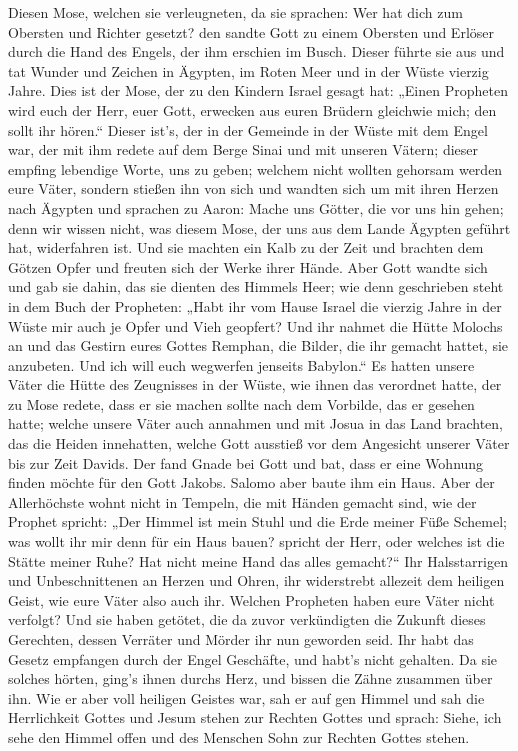  Diesen Mose, welchen sie verleugneten, da sie sprachen:
Wer hat dich zum Obersten und Richter gesetzt? den sandte Gott zu einem
Obersten und Erlöser durch die Hand des Engels, der ihm erschien im
Busch.  Dieser führte sie aus und tat Wunder und Zeichen
in Ägypten, im Roten Meer und in der Wüste vierzig Jahre.
 Dies ist der Mose, der zu den Kindern Israel gesagt hat:
„Einen Propheten wird euch der Herr, euer Gott, erwecken aus euren
Brüdern gleichwie mich; den sollt ihr hören.``  Dieser
ist's, der in der Gemeinde in der Wüste mit dem Engel war, der mit ihm
redete auf dem Berge Sinai und mit unseren Vätern; dieser empfing
lebendige Worte, uns zu geben;  welchem nicht wollten
gehorsam werden eure Väter, sondern stießen ihn von sich und wandten
sich um mit ihren Herzen nach Ägypten  und sprachen zu
Aaron: Mache uns Götter, die vor uns hin gehen; denn wir wissen nicht,
was diesem Mose, der uns aus dem Lande Ägypten geführt hat, widerfahren
ist.  Und sie machten ein Kalb zu der Zeit und brachten
dem Götzen Opfer und freuten sich der Werke ihrer Hände. 
Aber Gott wandte sich und gab sie dahin, das sie dienten des Himmels
Heer; wie denn geschrieben steht in dem Buch der Propheten: „Habt ihr
vom Hause Israel die vierzig Jahre in der Wüste mir auch je Opfer und
Vieh geopfert?  Und ihr nahmet die Hütte Molochs an und
das Gestirn eures Gottes Remphan, die Bilder, die ihr gemacht hattet,
sie anzubeten. Und ich will euch wegwerfen jenseits Babylon.``
 Es hatten unsere Väter die Hütte des Zeugnisses in der
Wüste, wie ihnen das verordnet hatte, der zu Mose redete, dass er sie
machen sollte nach dem Vorbilde, das er gesehen hatte; 
welche unsere Väter auch annahmen und mit Josua in das Land brachten,
das die Heiden innehatten, welche Gott ausstieß vor dem Angesicht
unserer Väter bis zur Zeit Davids.  Der fand Gnade bei
Gott und bat, dass er eine Wohnung finden möchte für den Gott Jakobs.
 Salomo aber baute ihm ein Haus.  Aber der
Allerhöchste wohnt nicht in Tempeln, die mit Händen gemacht sind, wie
der Prophet spricht:  „Der Himmel ist mein Stuhl und die
Erde meiner Füße Schemel; was wollt ihr mir denn für ein Haus bauen?
spricht der Herr, oder welches ist die Stätte meiner Ruhe?
 Hat nicht meine Hand das alles gemacht?{}``
 Ihr Halsstarrigen und Unbeschnittenen an Herzen und
Ohren, ihr widerstrebt allezeit dem heiligen Geist, wie eure Väter also
auch ihr.  Welchen Propheten haben eure Väter nicht
verfolgt? Und sie haben getötet, die da zuvor verkündigten die Zukunft
dieses Gerechten, dessen Verräter und Mörder ihr nun geworden seid.
 Ihr habt das Gesetz empfangen durch der Engel Geschäfte,
und habt's nicht gehalten.  Da sie solches hörten, ging's
ihnen durchs Herz, und bissen die Zähne zusammen über ihn.
 Wie er aber voll heiligen Geistes war, sah er auf gen
Himmel und sah die Herrlichkeit Gottes und Jesum stehen zur Rechten
Gottes  und sprach: Siehe, ich sehe den Himmel offen und
des Menschen Sohn zur Rechten Gottes stehen.

